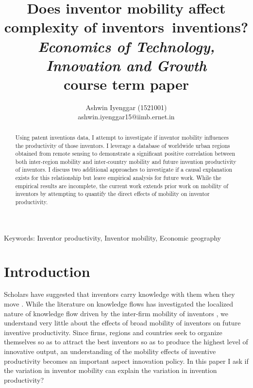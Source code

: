 \documentclass[12pt]{article}
\begin{document}
\title{\LARGE Does inventor mobility affect complexity of inventors\textquotesingle \ inventions?\\ \Large \textit{Economics of Technology, Innovation and Growth} \\course term paper}
\author{Ashwin Iyenggar  (1521001) \\ ashwin.iyenggar15@iimb.ernet.in} 
\large

\maketitle
\thispagestyle{empty}

\begin{abstract}
\large \noindent Using patent inventions data, I attempt to investigate if inventor mobility influences the productivity of those inventors. I leverage a database of worldwide urban regions  obtained from remote sensing to demonstrate a significant positive correlation between both inter-region mobility  and inter-country mobility and future invention productivity of inventors. I discuss two additional approaches to investigate if a causal explanation exists for this relationship but leave empirical analysis for future work. While the empirical results are incomplete, the current work extends prior work on mobility of inventors by attempting to quantify the direct effects of  mobility on inventor productivity.
\end{abstract}
{Keywords:} Inventor productivity, Inventor mobility, Economic geography
\onehalfspacing
\section{Introduction}
Scholars have suggested that inventors carry knowledge with them when they move \citep{Almeida1999}. While the literature on knowledge flows has investigated the localized nature of knowledge flow driven by the inter-firm mobility of inventors \citep{Jaffe1993, Almeida1999, Alcacer2006a}, we understand very little about the effects of broad mobility of inventors on future inventive productivity. Since firms, regions and countries seek to organize themselves so as to attract the best inventors so as to produce the highest level of innovative output, an understanding of the mobility effects of inventive productivity becomes an important aspect innovation policy. In this paper I ask if  the variation in inventor mobility can explain the variation in invention productivity?
\end{document}
